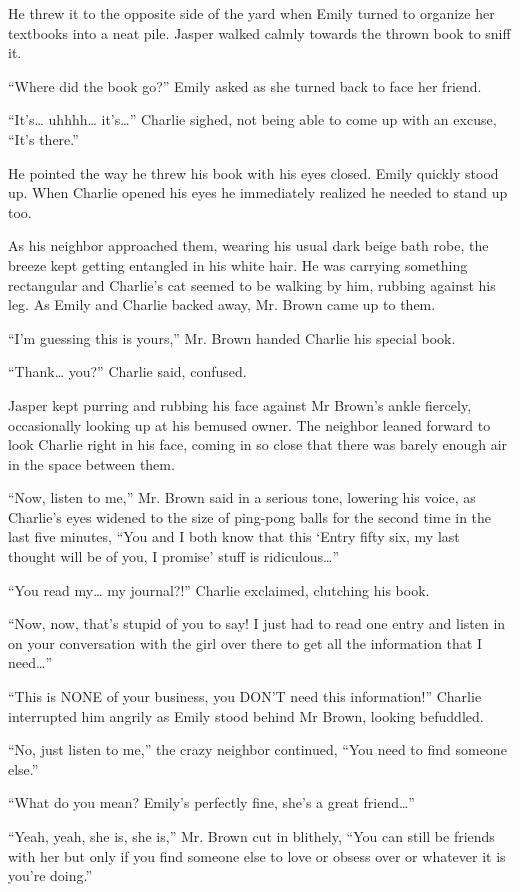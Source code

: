 He threw it to the opposite side of the yard when Emily turned to organize her textbooks into a neat pile. Jasper walked calmly towards the thrown book to sniff it.

“Where did the book go?” Emily asked as she turned back to face her friend.

“It’s… uhhhh… it’s…” Charlie sighed, not being able to come up with an excuse, “It’s there.”

He pointed the way he threw his book with his eyes closed. Emily quickly stood up. When Charlie opened his eyes he immediately realized he needed to stand up too.

As his neighbor approached them, wearing his usual dark beige bath robe, the breeze kept getting entangled in his white hair. He was carrying something rectangular and Charlie’s cat seemed to be walking by him, rubbing against his leg. As Emily and Charlie backed away, Mr. Brown came up to them.

“I’m guessing this is yours,” Mr. Brown handed Charlie his special book.

“Thank… you?” Charlie said, confused.

Jasper kept purring and rubbing his face against Mr Brown’s ankle fiercely, occasionally looking up at his bemused owner. The neighbor leaned forward to look Charlie right in his face, coming in so close that there was barely enough air in the space between them.

“Now, listen to me,” Mr. Brown said in a serious tone, lowering his voice, as Charlie’s eyes widened to the size of ping-pong balls for the second time in the last five minutes, “You and I both know that this ‘Entry fifty six, my last thought will be of you, I promise’ stuff is ridiculous…”

“You read my… my journal?!” Charlie exclaimed, clutching his book.

“Now, now, that’s stupid of you to say! I just had to read one entry and listen in on your conversation with the girl over there to get all the information that I need…”

“This is NONE of your business, you DON’T need this information!” Charlie interrupted him angrily as Emily stood behind Mr Brown, looking befuddled.

“No, just listen to me,” the crazy neighbor continued, “You need to find someone else.”

“What do you mean? Emily’s perfectly fine, she’s a great friend…”

“Yeah, yeah, she is, she is,” Mr. Brown cut in blithely, “You can still be friends with her but only if you find someone else to love or obsess over or whatever it is you’re doing.”

